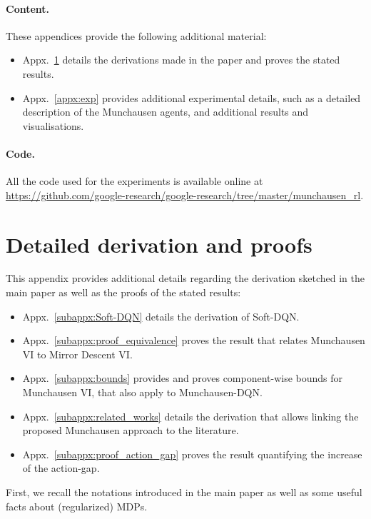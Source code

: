 \documentclass{article}
\begin{document}
\clearpage



\clearpage

\appendix

\paragraph{Content.} These appendices provide the following additional material:
\begin{itemize}
    \item Appx.~\ref{appx:proofs} details the derivations made in the paper and proves the stated results.
    \item Appx.~\ref{appx:exp} provides additional experimental details, such as a detailed description of the Munchausen agents, and additional results and visualisations.
\end{itemize}

\paragraph{Code.} All the code used for the experiments is available online at \url{https://github.com/google-research/google-research/tree/master/munchausen_rl}.

\section{Detailed derivation and proofs}
\label{appx:proofs}

This appendix provides additional details regarding the derivation sketched in the main paper as well as the proofs of the stated results:
\begin{itemize}
    \item Appx.~\ref{subappx:Soft-DQN} details the derivation of Soft-DQN.
    \item Appx.~\ref{subappx:proof_equivalence} proves the result that relates Munchausen VI to Mirror Descent VI.
    \item Appx.~\ref{subappx:bounds} provides and proves component-wise bounds for Munchausen VI, that also apply to Munchausen-DQN.
    \item Appx.~\ref{subappx:related_works} details the derivation that allows linking the proposed Munchausen approach to the literature.
    \item Appx.~\ref{subappx:proof_action_gap} proves the result quantifying the increase of the action-gap.
\end{itemize}
First, we recall the notations introduced in the main paper as well as some useful facts about (regularized) MDPs.
\end{document}
